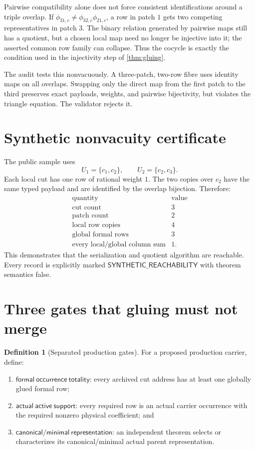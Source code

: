 \documentclass[11pt]{article}
\theoremstyle{definition}
\newtheorem{definition}[theorem]{Definition}
\theoremstyle{remark}
\begin{document}
Pairwise compatibility alone does not force consistent identifications
around a triple overlap.  If
\(\phi_{31,c}\ne\phi_{32,c}\phi_{21,c}\), a row in patch \(1\) gets
two competing representatives in patch \(3\).  The binary relation
generated by pairwise maps still has a quotient, but a chosen local
map need no longer be injective into it; the asserted common row
family can collapse.  Thus the cocycle is exactly the condition used
in the injectivity step of \cref{thm:gluing}.

The audit tests this nonvacuously.  A three-patch, two-row fibre uses
identity maps on all overlaps.  Swapping only the direct map from the
first patch to the third preserves exact payloads, weights, and
pairwise bijectivity, but violates the triangle equation.  The
validator rejects it.

\section{Synthetic nonvacuity certificate}

The public sample uses
\[
 U_1=\{c_1,c_2\},\qquad U_2=\{c_2,c_3\}.
\]
Each local cut has one row of rational weight \(1\).  The two copies
over \(c_2\) have the same typed payload and are identified by the
overlap bijection.  Therefore:
\[
\begin{array}{c|c}
\text{quantity}&\text{value}\\
\hline
\text{cut count}&3\\
\text{patch count}&2\\
\text{local row copies}&4\\
\text{global formal rows}&3\\
\text{every local/global column sum}&1.
\end{array}
\]
This demonstrates that the serialization and quotient algorithm are
reachable.  Every record is explicitly marked
\(\mathsf{SYNTHETIC\_REACHABILITY}\) with theorem semantics false.

\section{Three gates that gluing must not merge}

\begin{definition}[Separated production gates]\label{def:gates}
For a proposed production carrier, define:
\begin{enumerate}[label=(G\arabic*),leftmargin=2.5em]
 \item \(\mathsf{formal\ occurrence\ totality}\): every archived cut
       address has at least one globally glued formal row;
 \item \(\mathsf{actual\ active\ support}\): every required row is an
       actual carrier occurrence with the required nonzero physical
       coefficient; and
 \item \(\mathsf{canonical/minimal\ representation}\): an independent
       theorem selects or characterizes its canonical/minimal actual
       parent representation.
\end{enumerate}
\end{definition}
\end{document}
